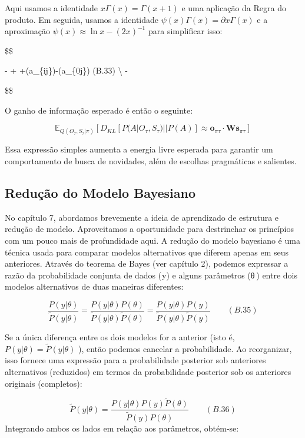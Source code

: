 \documentclass[
  12pt,
]{book}
\begin{document}
Aqui usamos a identidade \(x\Gamma(x) = \Gamma(x+1)\) e uma aplicação da Regra do produto. Em seguida, usamos a identidade \(ψ(x)Γ(x) = ∂xΓ(x)\) e a aproximação \(ψ(x) ≈ \ln x − (2x)^{−1}\) para simplificar isso:

\$\$

 -  + \ln {}+\psi(a\_\{ij\})-\psi(a\_\{0j\}) \qquad (B.33) \textbackslash{}
\approx {} - 

\$\$

O ganho de informação esperado é então o seguinte:

\[ \mathbb E_{Q(O_\tau,S_\tau | \pi)}  [ D_{KL}[P(A| O_\tau, S_\tau) || P(A)] \approx \pmb o_{\pi\tau} \cdot \pmb W \pmb s_{\pi\tau} ] \]

Essa expressão simples aumenta a energia livre esperada para garantir um comportamento de busca de novidades, além de escolhas pragmáticas e salientes.

\hypertarget{reduuxe7uxe3o-do-modelo-bayesiano}{%
\subsection{Redução do Modelo Bayesiano}\label{reduuxe7uxe3o-do-modelo-bayesiano}}

No capítulo 7, abordamos brevemente a ideia de aprendizado de estrutura e redução de modelo. Aproveitamos a oportunidade para destrinchar os princípios com um pouco mais de profundidade aqui. A redução do modelo bayesiano é uma técnica usada para comparar modelos alternativos que diferem apenas em seus anteriores. Através do teorema de Bayes (ver capítulo 2), podemos expressar a razão da probabilidade conjunta de dados ( y) e alguns parâmetros (θ ) entre dois modelos alternativos de duas maneiras diferentes:

\[ \frac{P(y|\theta)}{\tilde P(y|\theta)}
=\frac{P(y|\theta)P(\theta)}{\tilde P(y|\theta)\tilde P(\theta)}=
\frac{P(y|\theta)P(y)}{\tilde P(y|\theta)\tilde P(y)} \qquad (B.35)\]

Se a única diferença entre os dois modelos for a anterior (isto é, \(P(y | \theta) = \tilde P(y | \theta)\) ), então podemos cancelar a probabilidade. Ao reorganizar, isso fornece uma expressão para a probabilidade posterior sob anteriores alternativos (reduzidos) em termos da probabilidade posterior sob os anteriores originais (completos):

\[ \tilde P(y | \theta) = \frac{P(y | \theta)P(y)\tilde P(\theta)}{\tilde P(y)P(\theta)} \qquad (B.36)\]
Integrando ambos os lados em relação aos parâmetros, obtém-se:
\end{document}
